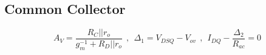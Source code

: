 ~\vspace{-3em}
\subsection{Common Collector}
$$ A_V = \dfrac{R_C || r_o}{g_m^{-1} + R_D||r_o} ~~ , ~~  {\Delta}_1 = V_{DSQ} - V_{ov} ~~ , ~~ I_{DQ} - \frac{{\Delta}_2}{R_{ac}} = 0 $$
\setlength{\parindent}{0.5cm} %
\par
\lipsum[1-4]
\setlength{\parindent}{0.0cm} 
\begin{minipage}[b]{.5\textwidth}
\lipsum[7]
\lipsum[66]
\end{minipage}%
\noindent
\setlength{\parindent}{0.0cm} 
\hspace*{-\parindent}%
\begin{minipage}[b]{.5\textwidth}
\raggedleft

\end{minipage}%
